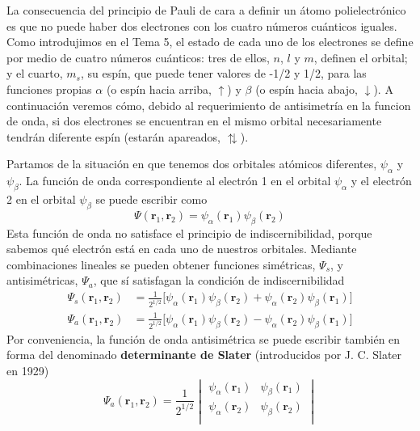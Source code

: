 La consecuencia del principio de Pauli de cara a definir 
un átomo polielectrónico es que no puede haber dos electrones con
los cuatro números cuánticos iguales. Como introdujimos en el 
Tema 5, el estado de cada uno de los electrones se define por medio
de cuatro números cuánticos: tres de ellos, $n$, $l$ y $m$, 
definen el orbital; y el cuarto, $m_s$, su espín, que puede
tener valores de -1/2 y 1/2, para las funciones propias $\alpha$
(o espín hacia arriba, $\uparrow$) y $\beta$ (o espín hacia abajo, $\downarrow$).
A continuación veremos
cómo, debido al requerimiento de antisimetría en la funcion de onda, 
si dos electrones se encuentran en el mismo orbital necesariamente 
tendrán diferente espín (estarán apareados, $\updownarrows$).
%

Partamos de la situación en que tenemos dos orbitales
atómicos diferentes, $\psi_\alpha$ y $\psi_\beta$. 
La función de onda correspondiente al electrón 1 en el 
orbital $\psi_\alpha$ y el electrón 2 en el orbital 
$\psi_\beta$ se puede escribir como
\begin{equation}
    \Psi(\mathbf{r}_1, \mathbf{r}_2) = \psi_\alpha (\mathbf{r}_1)\psi_\beta (\mathbf{r}_2)
\end{equation}
Esta función de onda no satisface el principio
de indiscernibilidad, porque sabemos qué electrón está en
cada uno de nuestros orbitales. Mediante combinaciones
lineales se pueden obtener funciones simétricas, $\Psi_s$,
y antisimétricas, $\Psi_a$, que sí satisfagan la condición
de indiscernibilidad
\begin{align}
    \Psi_s(\mathbf{r}_1, \mathbf{r}_2) &= \frac{1}{2^{1/2}} \big[\psi_\alpha(\mathbf{r}_1) \psi_\beta(\mathbf{r}_2) +  \psi_\alpha(\mathbf{r}_2) \psi_\beta(\mathbf{r}_1)\big]\\
    \Psi_a(\mathbf{r}_1, \mathbf{r}_2) &=\frac{1}{2^{1/2}}  \big[\psi_\alpha(\mathbf{r}_1) \psi_\beta(\mathbf{r}_2) -  \psi_\alpha(\mathbf{r}_2) \psi_\beta(\mathbf{r}_1)\big]
\end{align}
Por conveniencia, la función de onda antisimétrica se puede 
escribir también en forma del denominado \textbf{determinante 
de Slater} (introducidos por J. C. Slater en 1929)
\begin{equation}
    \Psi_a(\mathbf{r}_1,\mathbf{r}_2) = \frac{1}{2^{1/2}}
    \begin{vmatrix} 
    \psi_\alpha(\mathbf{r}_1) & \psi_\beta(\mathbf{r}_1)   \\
    \psi_\alpha(\mathbf{r}_2) & \psi_\beta(\mathbf{r}_2)  \\
    \end{vmatrix}
\end{equation}

